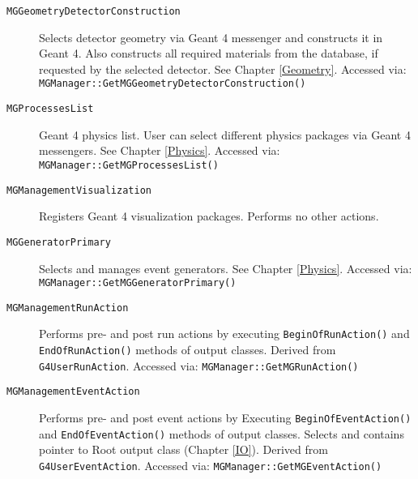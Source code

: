 \noindent
\begin{description}
\item[{\nolinkurl{MGGeometryDetectorConstruction}}] 

          Selects detector geometry via Geant 4 messenger and constructs it
         in Geant 4. Also constructs all required materials from the database,
	 if requested by the selected detector.
         See Chapter \ref{Geometry}. Accessed via:
 \texttt{M\-G\-M\-a\-n\-a\-g\-e\-r\-:\-:\-G\-e\-t\-M\-G\-G\-e\-o\-m\-e\-t\-r\-y\-D\-e\-t\-e\-c\-t\-o\-r\-C\-o\-n\-s\-t\-r\-u\-c\-t\-i\-o\-n\-(\-)}  


\item[{\nolinkurl{MGProcessesList}}] 

          Geant 4 physics list. User can select different physics packages
         via Geant 4 messengers. See Chapter \ref{Physics}. Accessed via:
 \texttt{M\-G\-M\-a\-n\-a\-g\-e\-r\-:\-:\-G\-e\-t\-M\-G\-P\-r\-o\-c\-e\-s\-s\-e\-s\-L\-i\-s\-t\-(\-)}  


\item[{\nolinkurl{MGManagementVisualization}}] 

          Registers Geant 4 visualization packages. Performs no other actions.
 


\item[{\nolinkurl{MGGeneratorPrimary}}] 

          Selects and manages event generators. See Chapter \ref{Physics}.
	 Accessed via:
 \texttt{M\-G\-M\-a\-n\-a\-g\-e\-r\-:\-:\-G\-e\-t\-M\-G\-G\-e\-n\-e\-r\-a\-t\-o\-r\-P\-r\-i\-m\-a\-r\-y\-(\-)}  


\item[{\nolinkurl{MGManagementRunAction}}] 

          Performs pre-{} and post run actions by 
         executing \texttt{B\-e\-g\-i\-n\-O\-f\-R\-u\-n\-A\-c\-t\-i\-o\-n\-(\-)} 	 and \texttt{E\-n\-d\-O\-f\-R\-u\-n\-A\-c\-t\-i\-o\-n\-(\-)} methods 
         of output
         classes. Derived from \nolinkurl{G4UserRunAction}.
	 Accessed via:
 \texttt{M\-G\-M\-a\-n\-a\-g\-e\-r\-:\-:\-G\-e\-t\-M\-G\-R\-u\-n\-A\-c\-t\-i\-o\-n\-(\-)}  


\item[{\nolinkurl{MGManagementEventAction}}] 

          Performs pre-{} and post event actions by 
         Executing \texttt{B\-e\-g\-i\-n\-O\-f\-E\-v\-e\-n\-t\-A\-c\-t\-i\-o\-n\-(\-)} 	 and \texttt{E\-n\-d\-O\-f\-E\-v\-e\-n\-t\-A\-c\-t\-i\-o\-n\-(\-)} methods 
         of output
         classes. Selects and contains pointer to Root output class 
         (Chapter \ref{IO}). 
         Derived from \nolinkurl{G4UserEventAction}.
	 Accessed via:
 \texttt{M\-G\-M\-a\-n\-a\-g\-e\-r\-:\-:\-G\-e\-t\-M\-G\-E\-v\-e\-n\-t\-A\-c\-t\-i\-o\-n\-(\-)}  



\end{description}
